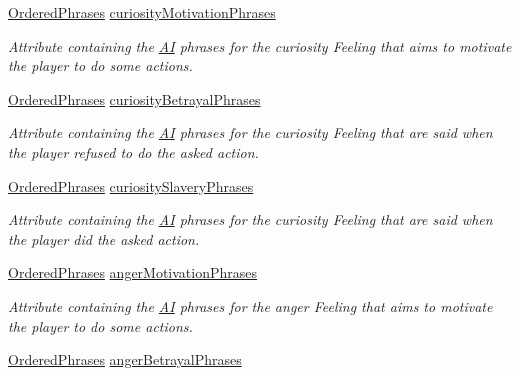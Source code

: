 \begin{DoxyCompactItemize}
\item 
\hyperlink{classgameplay_1_1ai_1_1phrasing_1_1_ordered_phrases}{Ordered\-Phrases} \hyperlink{classgameplay_1_1ai_1_1phrasing_1_1_phrasing_ad82ede6d0263d91e13511606f6696a18}{curiosity\-Motivation\-Phrases}
\begin{DoxyCompactList}\small\item\em Attribute containing the \hyperlink{classgameplay_1_1ai_1_1_a_i}{A\-I} phrases for the curiosity Feeling that aims to motivate the player to do some actions. \end{DoxyCompactList}\item 
\hyperlink{classgameplay_1_1ai_1_1phrasing_1_1_ordered_phrases}{Ordered\-Phrases} \hyperlink{classgameplay_1_1ai_1_1phrasing_1_1_phrasing_a10f436b3727af6eedab39a382801306c}{curiosity\-Betrayal\-Phrases}
\begin{DoxyCompactList}\small\item\em Attribute containing the \hyperlink{classgameplay_1_1ai_1_1_a_i}{A\-I} phrases for the curiosity Feeling that are said when the player refused to do the asked action. \end{DoxyCompactList}\item 
\hyperlink{classgameplay_1_1ai_1_1phrasing_1_1_ordered_phrases}{Ordered\-Phrases} \hyperlink{classgameplay_1_1ai_1_1phrasing_1_1_phrasing_a2e35ff33685cec980af1454e7f255d06}{curiosity\-Slavery\-Phrases}
\begin{DoxyCompactList}\small\item\em Attribute containing the \hyperlink{classgameplay_1_1ai_1_1_a_i}{A\-I} phrases for the curiosity Feeling that are said when the player did the asked action. \end{DoxyCompactList}\item 
\hyperlink{classgameplay_1_1ai_1_1phrasing_1_1_ordered_phrases}{Ordered\-Phrases} \hyperlink{classgameplay_1_1ai_1_1phrasing_1_1_phrasing_a2fb3c3c2b96efbc4afee915d58967130}{anger\-Motivation\-Phrases}
\begin{DoxyCompactList}\small\item\em Attribute containing the \hyperlink{classgameplay_1_1ai_1_1_a_i}{A\-I} phrases for the anger Feeling that aims to motivate the player to do some actions. \end{DoxyCompactList}\item 
\hyperlink{classgameplay_1_1ai_1_1phrasing_1_1_ordered_phrases}{Ordered\-Phrases} \hyperlink{classgameplay_1_1ai_1_1phrasing_1_1_phrasing_a69df7c3975018f12a43f29172bbc5789}{anger\-Betrayal\-Phrases}

\end{DoxyCompactItemize}
